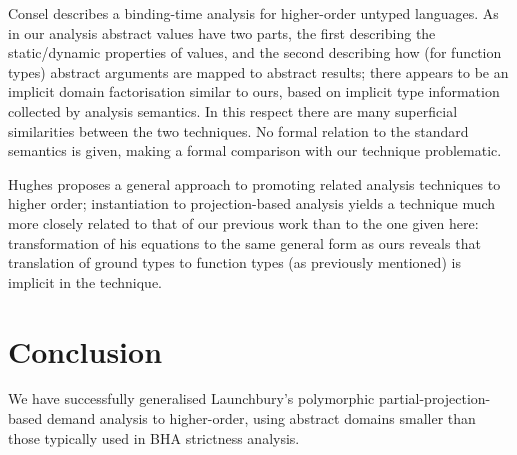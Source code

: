 \documentclass[11pt]{article}
\begin{document}
Consel \cite{Con90} describes a binding-time analysis for higher-order
untyped languages.  As in our analysis abstract values have two parts,
the first describing the static/dynamic properties of values, and the
second describing how (for function types) abstract arguments are
mapped to abstract results; there appears to be an implicit domain
factorisation similar to ours, based on implicit type information
collected by analysis semantics.  In this respect there are many
superficial similarities between the two techniques.  No formal
relation to the standard semantics is given, making a formal
comparison with our technique problematic.

Hughes \cite{Hug88} proposes a general approach to promoting related
analysis techniques to higher order; instantiation to projection-based
analysis yields a technique much more closely related to that of our
previous work \cite{Dav93b} than to the one given here: transformation
of his equations to the same general form as ours reveals that
translation of ground types to function types (as previously mentioned)
is implicit in the technique.

\section{Conclusion}

We have successfully generalised Launchbury's polymorphic
partial-projection-based demand analysis to higher-order, using abstract
domains smaller than those typically used in BHA strictness analysis.


\end{document}
